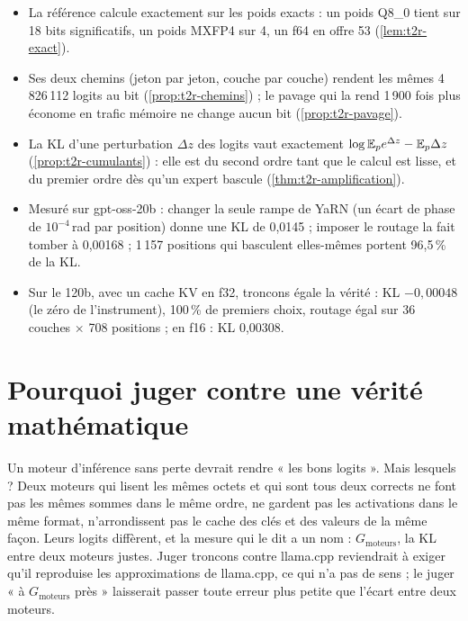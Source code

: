 \begin{enbref}
\begin{itemize}
\item La référence calcule exactement sur les poids exacts : un poids Q8\_0 tient sur 18 bits significatifs, un poids MXFP4 sur 4, un f64 en offre 53 (\cref{lem:t2r-exact}).
\item Ses deux chemins (jeton par jeton, couche par couche) rendent les mêmes 4\,826\,112 logits au bit (\cref{prop:t2r-chemins}) ; le pavage qui la rend 1\,900 fois plus économe en trafic mémoire ne change aucun bit (\cref{prop:t2r-pavage}).
\item La KL d'une perturbation $\Delta z$ des logits vaut exactement $\log \mathbb{E}_p e^{\Delta z} - \mathbb{E}_p \Delta z$ (\cref{prop:t2r-cumulants}) : elle est du second ordre tant que le calcul est lisse, et du premier ordre dès qu'un expert bascule (\cref{thm:t2r-amplification}).
\item Mesuré sur gpt-oss-20b : changer la seule rampe de YaRN (un écart de phase de $10^{-4}$\,rad par position) donne une KL de 0,0145 ; imposer le routage la fait tomber à 0,00168 ; 1\,157 positions qui basculent elles-mêmes portent 96,5\,\% de la KL.
\item Sur le 120b, avec un cache KV en f32, troncons égale la vérité : KL $-0{,}00048$ (le zéro de l'instrument), 100\,\% de premiers choix, routage égal sur 36 couches $\times$ 708 positions ; en f16 : KL 0,00308.
\end{itemize}
\end{enbref}

\section{Pourquoi juger contre une vérité mathématique}\label{sec:t2r-pourquoi}

Un moteur d'inférence sans perte devrait rendre « les bons logits ». Mais lesquels ? Deux moteurs qui lisent les mêmes octets et qui sont tous deux corrects ne font pas les mêmes sommes dans le même ordre, ne gardent pas les activations dans le même format, n'arrondissent pas le cache des clés et des valeurs de la même façon. Leurs logits diffèrent, et la mesure qui le dit a un nom : $G_{\text{moteurs}}$, la KL entre deux moteurs justes. Juger troncons contre llama.cpp reviendrait à exiger qu'il reproduise les approximations de llama.cpp, ce qui n'a pas de sens ; le juger « à $G_{\text{moteurs}}$ près » laisserait passer toute erreur plus petite que l'écart entre deux moteurs.

